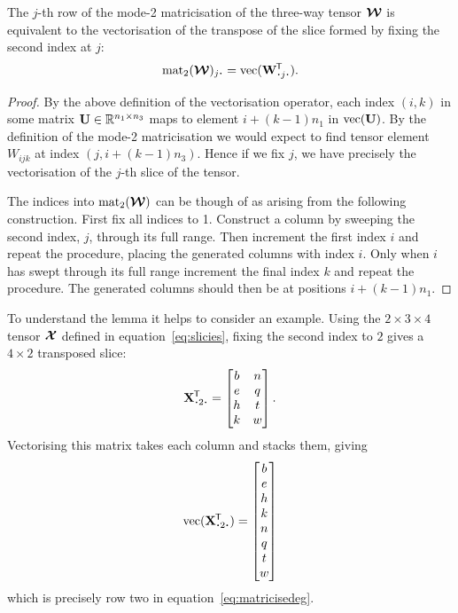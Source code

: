 \begin{lem}
The \(j\)-th row of the mode-2 matricisation of the three-way tensor \(\bm{\mathcal{W}}\)
is equivalent to the vectorisation of the transpose of the slice formed by fixing the second index 
at \(j\):
\begin{equation}\label{eq:matlemstatement}
	\matr_2 (\tensor{W})_{j \midbullet} = \vect(\tran{\mat{W}_{\midbullet j \midbullet}}).
\end{equation}
\label{lem:matricise}
\end{lem}
\begin{proof}
By the above definition of the vectorisation operator, each index \((i, k)\) in some matrix
\(\mathbf{U} \in \mathbb{R}^{n_1\times n_3}\) maps to element \(i + (k-1)n_1\) in
\(\operatorname{vec}(\mathbf{U})\). By the definition of the mode-2 matricisation we would expect to
find tensor element \(W_{ijk}\) at index \((j, i + (k-1)n_3)\). Hence if we fix \(j\), we have
precisely the vectorisation of the \(j\)-th slice of the tensor.

The indices into \(\operatorname{mat}_2(\bm{\mathcal{W}})\) can be though of as arising from the following construction.
First fix all indices to 1. Construct a column by sweeping the second index, \(j\),
through its full range. Then increment the first index \(i\) and repeat the procedure, placing
the generated columns with index \(i\). Only when \(i\) has swept through its full range
increment the final index \(k\) and repeat the procedure. The generated columns should then be
at positions \(i + (k-1)n_1\).
\end{proof}

To understand the lemma it helps to consider an example. Using the \(2 \times 3 \times 4\)
tensor \(\bm{\mathcal{X}}\) defined
in equation~\eqref{eq:slicies}, fixing the second index to \(2\) gives a \(4 \times 2\) 
transposed slice:
\begin{equation}\label{eq:mode2slice}
	\tran{\mat{X}_{\midbullet 2 \midbullet}} = \begin{bmatrix}
		b & n \\
		e & q \\
		h & t \\
		k & w
	\end{bmatrix}.
\end{equation} Vectorising this matrix takes each column and stacks them, giving
\begin{equation}\label{eq:veceg}
	\vect(\tran{\mat{X}_{\midbullet 2 \midbullet}}) = \begin{bmatrix}
		b \\
		e \\
		h \\
		k \\
		n \\
		q \\
		t \\
		w
	\end{bmatrix}
\end{equation} which is precisely row two in equation~\eqref{eq:matricisedeg}.


